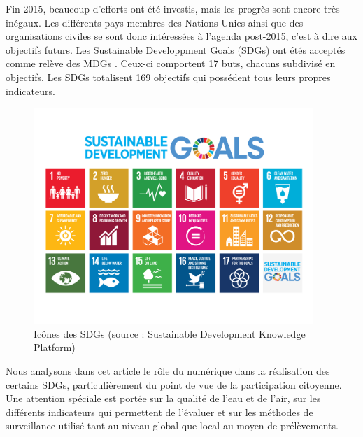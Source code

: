 \documentclass[10pt, article]{llncs}
\begin{document}
	Fin 2015, beaucoup d'efforts ont été investis, mais les progrès sont encore très inégaux. Les différents pays membres des Nations-Unies ainsi que des organisations civiles se sont donc intéressées à l'agenda post-2015, c'est à dire aux objectifs futurs. Les Sustainable Developpment Goals (SDGs) ont étés acceptés comme relève des MDGs \cite{wikipedia_sustainable_2017}. Ceux-ci comportent 17 buts, chacuns subdivisé en objectifs. Les SDGs totalisent 169 objectifs qui possédent tous leurs propres indicateurs.
	\begin{figure}
		\begin{center}
			\includegraphics[width=300pt]{img/sdgs.png}
		\end{center}
		\caption{Icônes des SDGs (source : Sustainable Development Knowledge Platform)}
	\end{figure}
	Nous analysons dans cet article le rôle du numérique dans la réalisation des certains SDGs, particulièrement du point de vue de la participation citoyenne. Une attention spéciale est portée sur la qualité de l'eau et de l'air, sur les différents indicateurs qui permettent de l'évaluer et sur les méthodes de surveillance utilisé tant au niveau global que local au moyen de prélèvements.
\end{document}

